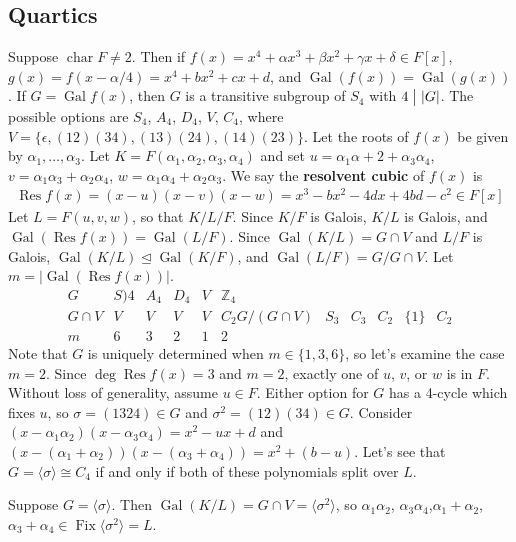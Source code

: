 \documentclass[11pt, a4paper]{memoir}
\DeclareMathOperator{\Z}{{\mathbb{Z}}}
\newcommand{\mbf}[1]{{\boldmath\bfseries #1}}
\renewcommand{\div}{\bigm|}
\theoremstyle{change}
\theoremstyle{plain}
\theoremstyle{nonumberplain}
\DeclareMathOperator{\chr}{char}
\DeclareMathOperator{\Fix}{Fix}
\DeclareMathOperator{\Gal}{Gal}
\DeclareMathOperator{\Res}{Res}
\numberwithin{equation}{section}
\begin{document}
\subsection{Quartics}
Suppose $\chr F\neq 2$.
Then if $f(x)=x^4+\alpha x^3+\beta x^2+\gamma x+\delta\in F[x]$, $g(x)=f(x-\alpha/4)=x^4+bx^2+cx+d$, and $\Gal(f(x))=\Gal(g(x))$.
If $G=\Gal f(x)$, then $G$ is a transitive subgroup of $S_4$ with $4\div|G|$.
The possible options are $S_4$, $A_4$, $D_4$, $V$, $C_4$, where $V=\{\epsilon,(12)(34),(13)(24),(14)(23)\}$.
Let the roots of $f(x)$ be given by $\alpha_1,\ldots,\alpha_3$.
Let $K=F(\alpha_1,\alpha_2,\alpha_3,\alpha_4)$ and set $u=\alpha_1\alpha+2+\alpha_3\alpha_4$, $v=\alpha_1\alpha_3+\alpha_2\alpha_4$, $w=\alpha_1\alpha_4+\alpha_2\alpha_3$.
We say the \mbf{resolvent cubic} of $f(x)$ is
\begin{align*}
    \Res f(x) = (x-u)(x-v)(x-w)=x^3-bx^2-4dx+4bd-c^2\in F[x]
\end{align*}
Let $L=F(u,v,w)$, so that $K/L/F$.
Since $K/F$ is Galois, $K/L$ is Galois, and $\Gal(\Res f(x))=\Gal(L/F)$.
Since $\Gal(K/L)=G\cap V$ and $L/F$ is Galois, $\Gal(K/L)\trianglelefteq\Gal(K/F)$, and $\Gal(L/F)=G/G\cap V$.
Let $m=|\Gal(\Res f(x))|$.
\begin{equation*}
    \begin{array}{c|ccccc}
        G & S)4 & A_4 & D_4 & V & \Z_4\\
        G\cap V &V&V&V&V&C_2
        G/(G\cap V) & S_3 & C_3 & C_2 & \{1\} & C_2\\
        m & 6 & 3 & 2 & 1 & 2
    \end{array}
\end{equation*}
Note that $G$ is uniquely determined when $m\in\{1,3,6\}$, so let's examine the case $m=2$.
Since $\deg\Res f(x)=3$ and $m=2$, exactly one of $u$, $v$, or $w$ is in $F$.
Without loss of generality, assume $u\in F$.
Either option for $G$ has a 4-cycle which fixes $u$, so $\sigma=(1324)\in G$ and $\sigma^2=(12)(34)\in G$.
Consider $(x-\alpha_1\alpha_2)(x-\alpha_3\alpha_4)=x^2-ux+d$ and $(x-(\alpha_1+\alpha_2))(x-(\alpha_3+\alpha_4))=x^2+(b-u)$.
Let's see that $G=\langle\sigma\rangle\cong C_4$ if and only if both of these polynomials split over $L$.

Suppose $G=\langle\sigma\rangle$.
Then $\Gal(K/L)=G\cap V=\langle\sigma^2\rangle$, so $\alpha_1\alpha_2$, $\alpha_3\alpha_4$,$\alpha_1+\alpha_2$,$\alpha_3+\alpha_4\in\Fix\langle\sigma^2\rangle=L$.
\end{document}
